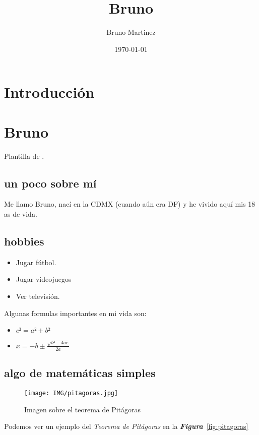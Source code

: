 \documentclass{book}
\author{Bruno Martinez}
\title{Bruno}
\date{\today}
\begin{document}
\maketitle

\chapter*{Introducción}

\chapter{Bruno}

Plantilla de \large{\LaTex.}

\section{un poco sobre mí}

Me llamo Bruno, nací en la CDMX (cuando aún era DF) y he vivido aquí mis 18 as de vida. 


\section{hobbies}
\begin{itemize}
\item Jugar fútbol.
\item Jugar videojuegos
\item Ver televisión.
\end {itemize}

\newpage
Algunas formulas importantes en mi vida son:
\begin{itemize}
\item $c² = a² + b²$
\item $x=-b \pm \frac{\sqrt{b²-4ac}}{2a}$
\end{itemize}

\section{algo de matemáticas simples}
\begin{figure}[h]
  \centering
  \texttt{[image: IMG/pitagoras.jpg]}
  \caption{Imagen sobre el teorema de Pitágoras}
  \label{fig:Pitágoras}
\end{figure}

Podemos ver un ejemplo del \emph{Teorema de Pitágoras} en la \emph{\textbf{Figura}}~\ref{fig:pitagoras}
  


\end{document}
